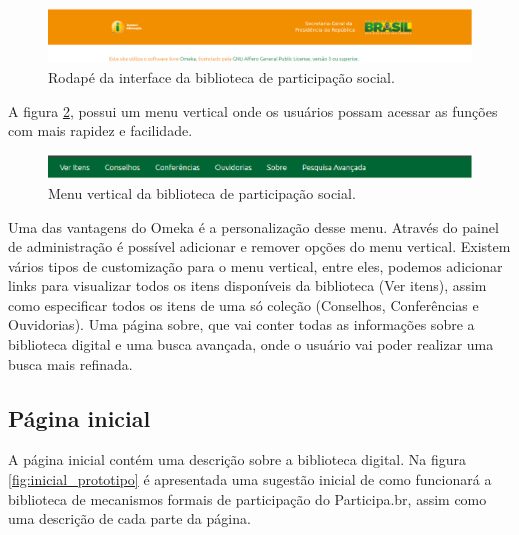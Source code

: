 \graphicspath{{figuras/prototipo/}}
\begin{figure}[H]
\centering
\includegraphics[width=1.0\textwidth]{rodape}
\caption{Rodapé da interface da biblioteca de participação social.}
\label{fig:rodape_prototipo}
\end{figure}

A figura \ref{fig:vertical_prototipo}, possui um menu vertical onde os usuários possam acessar as funções com mais rapidez e facilidade.

\graphicspath{{figuras/prototipo/}}
\begin{figure}[H]
\centering
\includegraphics[width=1.0\textwidth]{barra-superior}
\caption{Menu vertical da biblioteca de participação social.}
\label{fig:vertical_prototipo}
\end{figure}

Uma das vantagens do Omeka é a personalização desse menu. Através do painel de administração é possível adicionar e remover opções do menu vertical. Existem vários tipos de customização para o menu vertical, entre eles, podemos adicionar links para visualizar todos os itens disponíveis da biblioteca (Ver itens), assim como especificar todos os itens de uma só coleção (Conselhos, Conferências e Ouvidorias). Uma página sobre, que vai conter todas as informações sobre a biblioteca digital e uma busca avançada, onde o usuário vai poder realizar uma busca mais refinada.

\subsection*{Página inicial}

A página inicial contém uma descrição sobre a biblioteca digital. Na figura \ref{fig:inicial_prototipo} é apresentada uma sugestão inicial de como funcionará a biblioteca de mecanismos formais de participação do Participa.br, assim como uma descrição de cada parte da página.


